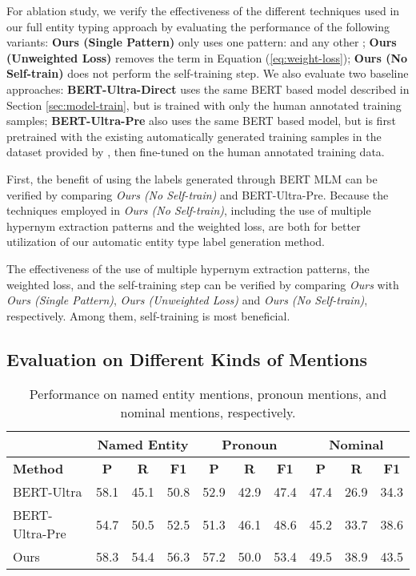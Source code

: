 \documentclass[11pt,a4paper]{article}
\begin{document}
For ablation study, we verify the effectiveness of the different techniques used in our full entity typing approach by evaluating the performance of the following variants: \textbf{Ours (Single Pattern)} only uses one pattern:  and any other ; \textbf{Ours (Unweighted Loss)} removes the  term in Equation (\ref{eq:weight-loss}); \textbf{Ours (No Self-train)} does not perform the self-training step. We also evaluate two baseline approaches: \textbf{BERT-Ultra-Direct} uses the same BERT based model described in Section \ref{sec:model-train}, but is trained with only the human annotated training samples; \textbf{BERT-Ultra-Pre} also uses the same BERT based model, but is first pretrained with the existing automatically generated training samples in the dataset provided by \citet{choi2018ultra}, then fine-tuned on the human annotated training data.



First, the benefit of using the labels generated through BERT MLM can be verified by comparing \textit{Ours (No Self-train)} and BERT-Ultra-Pre. Because the techniques employed in \textit{Ours (No Self-train)}, including the use of multiple hypernym extraction patterns and the weighted loss, are both for better utilization of our automatic entity type label generation method.

The effectiveness of the use of multiple hypernym extraction patterns, the weighted loss, and the self-training step can be verified by comparing \textit{Ours} with \textit{Ours (Single Pattern)}, \textit{Ours (Unweighted Loss)} and \textit{Ours (No Self-train)}, respectively. Among them, self-training is most beneficial.









\subsection{Evaluation on Different Kinds of Mentions}

\begin{table*}
\centering
\begin{tabular}{lccccccccc}
\hline & \multicolumn{3}{c}{Named Entity} & \multicolumn{3}{c}{Pronoun} & \multicolumn{3}{c}{Nominal} \\
\hline \textbf{Method} & \textbf{P} & \textbf{R} & \textbf{F1} & \textbf{P} & \textbf{R} & \textbf{F1} & \textbf{P} & \textbf{R} & \textbf{F1} \\ \hline
BERT-Ultra & 58.1 & 45.1 & 50.8 & 52.9 & 42.9 & 47.4 & 47.4 & 26.9 & 34.3 \\
BERT-Ultra-Pre & 54.7 & 50.5 & 52.5 & 51.3 & 46.1 & 48.6 & 45.2 & 33.7 & 38.6 \\
Ours & 58.3 & 54.4 & 56.3 & 57.2 & 50.0 & 53.4 & 49.5 & 38.9 & 43.5 \\ \hline
\end{tabular}
\caption{\label{tab:performance-mkind} Performance on named entity mentions, pronoun mentions, and nominal mentions, respectively.}
\end{table*}
\end{document}
